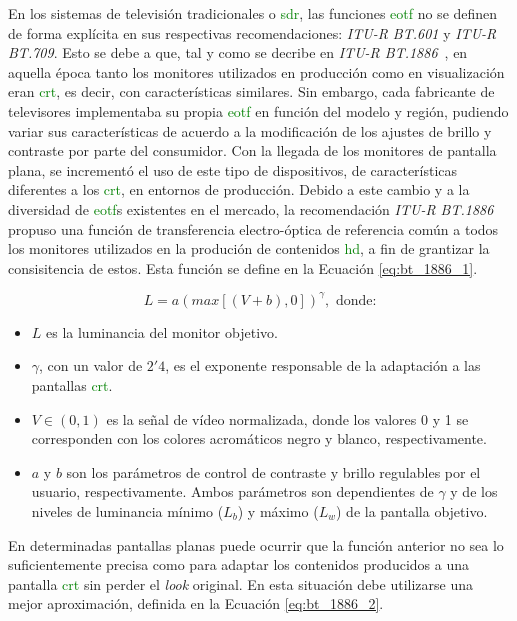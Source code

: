 \documentclass[a4paper, 12pt]{report}
\begin{document}
 En los sistemas de televisión tradicionales o \textcolor{green}{sdr}, las funciones \textcolor{green}{eotf} no se definen de forma explícita
en sus respectivas recomendaciones: \textit{ITU-R BT.601} y \textit{ITU-R BT.709}. Esto se debe a que, tal y como se decribe en \textit{ITU-R BT.1886}~\cite{itu_r:_bt1886}, en aquella época tanto los monitores utilizados en producción como en visualización eran  \textcolor{green}{crt}, es decir, con características similares. Sin embargo, cada fabricante de televisores implementaba su propia \textcolor{green}{eotf} en función del modelo y región, pudiendo variar sus características de acuerdo a la modificación  de los ajustes de brillo y contraste por parte del consumidor. 
Con la llegada de los monitores de pantalla plana, se incrementó el uso de este tipo de dispositivos, de características diferentes a los \textcolor{green}{crt}, en entornos de producción. Debido a este cambio y a la diversidad de \textcolor{green}{eotf}s existentes en el mercado, la recomendación \textit{ITU-R BT.1886} propuso una función de transferencia electro-óptica de referencia común a todos los monitores utilizados en la produción de contenidos \textcolor{green}{hd}, a fin de grantizar la consisitencia de estos. Esta función se define en la Ecuación \ref{eq:bt_1886_1}.

\footnotesize
\begin{equation} \label{eq:bt_1886_1}
    L= a (max[(V + b),0])^{\gamma},\textrm{  donde:}
\end{equation}
\begin{itemize}
    \item $L$ es la luminancia del monitor objetivo.
    \item  $\gamma$, con un valor de $2'4$, es el exponente responsable de la adaptación a las pantallas \textcolor{green}{crt}.
    \item  $V  \in (0, 1)$ es la señal de vídeo normalizada, donde los valores 0 y 1 se corresponden con los colores acromáticos negro y blanco, respectivamente.
    \item $a$ y $b$ son los parámetros de control de contraste y brillo regulables por el usuario, respectivamente. Ambos parámetros son dependientes de $\gamma$ y de los niveles de luminancia mínimo ($L_{b}$) y máximo ($L_{w}$) de la pantalla objetivo.
\end{itemize}

\normalsize
En determinadas pantallas planas puede ocurrir que la función anterior no sea lo suficientemente precisa como para adaptar los contenidos producidos a una pantalla \textcolor{green}{crt} sin perder el \textit{look} original. En esta situación debe utilizarse una mejor aproximación, definida en la Ecuación \ref{eq:bt_1886_2}.
\end{document}
